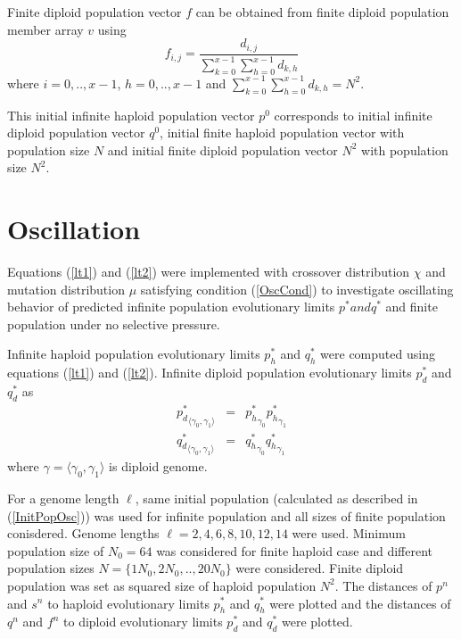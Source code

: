 Finite diploid population vector $f$ can be obtained from finite diploid population member array $v$  using
\[
f_{i,j} = \frac{d_{i,j}}{\sum \limits_{k=0}^{x-1} \sum \limits_{h=0}^{x-1} d_{k,h}}
\]
where $i = 0,.., x-1$, $h = 0,.., x-1$ and $\sum \limits_{k=0}^{x-1} \sum \limits_{h=0}^{x-1} d_{k,h} = N^2$.

This initial infinite haploid population vector $p^0$ corresponds to initial infinite diploid population vector $q^0$, initial finite 
haploid population vector with population size $N$ and initial finite diploid population vector $N^2$ with population size $N^2$.

\section{Oscillation}
\label{Oscillation}

Equations (\ref{lt1}) and (\ref{lt2}) were implemented with crossover distribution $\chi$ and mutation distribution $\mu$ satisfying 
condition (\ref{OscCond}) to investigate oscillating behavior of predicted infinite population evolutionary limits $p^{\ast} and q^{\ast}$ 
and finite population under no selective pressure.

Infinite haploid population evolutionary limits $p_h^{\ast}$ and $q_h^{\ast}$ were computed using equations (\ref{lt1}) and (\ref{lt2}). 
Infinite diploid population evolutionary limits $p_d^{\ast}$ and $q_d^{\ast}$ as
\begin{eqnarray*}
{p_d^{\ast}}_{\langle \gamma_0, \gamma_1 \rangle} & = & {p_h^{\ast}}_{\gamma_0} {p_h^{\ast}}_{\gamma_1} \\
{q_d^{\ast}}_{\langle \gamma_0, \gamma_1 \rangle} & = & {q_h^{\ast}}_{\gamma_0} {q_h^{\ast}}_{\gamma_1}
\end{eqnarray*}
where $\gamma = \langle \gamma_0, \gamma_1 \rangle$ is diploid genome.

For a genome length $\ell$, same initial population (calculated as described in (\ref{InitPopOsc})) was used for infinite population and all 
sizes of finite population conisdered.
Genome lengths $\ell = {2, 4, 6, 8, 10, 12, 14}$ were used. Minimum population size of $N_0 = 64$ was considered for finite haploid case and 
different population sizes $N = \{1N_0, 2N_0,.., 20N_0\}$ were considered. Finite diploid population was set as squared size of haploid 
population $N^2$.
The distances of $p^n$ and $s^n$ to haploid evolutionary limits $p_h^{\ast}$ and $q_h^{\ast}$ were plotted and the distances of $q^n$ and 
$f^n$ to diploid evolutionary limits $p_d^{\ast}$ and $q_d^{\ast}$ were plotted.


